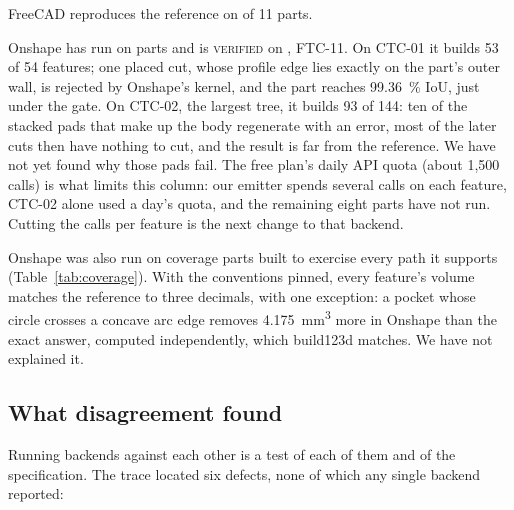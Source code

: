 \documentclass[11pt]{article}
\newcommand{\VERIFIED}{\textsc{verified}}
\begin{document}


FreeCAD reproduces the reference on \FCverified{} of 11 parts. \FCnote{}

Onshape has run on \OSrun{} parts and is \VERIFIED{} on \OSverified{}, FTC-11.
On CTC-01 it builds 53 of 54 features; one placed cut, whose profile edge lies
exactly on the part's outer wall, is rejected by Onshape's kernel, and the part
reaches \SI{99.36}{\percent} IoU, just under the gate. On CTC-02, the largest
tree, it builds 93 of 144: ten of the stacked pads that make up the body
regenerate with an error, most of the later cuts then have nothing to cut, and
the result is far from the reference. We have not yet found why those pads fail.
The free plan's daily API quota (about 1,500 calls) is what limits this column:
our emitter spends several calls on each feature, CTC-02 alone used a day's
quota, and the remaining eight parts have not run. Cutting the calls per feature
is the next change to that backend.

Onshape was also run on coverage parts built to exercise every path it supports
(Table~\ref{tab:coverage}). With the conventions pinned, every feature's volume
matches the reference to three decimals, with one exception: a pocket whose
circle crosses a concave arc edge removes \SI{4.175}{mm^3} more in Onshape than
the exact answer, computed independently, which build123d matches. We have not
explained it.

\subsection{What disagreement found}\label{sec:defects}

Running backends against each other is a test of each of them and of the
specification. The trace located six defects, none of which any single backend
reported:
\end{document}
